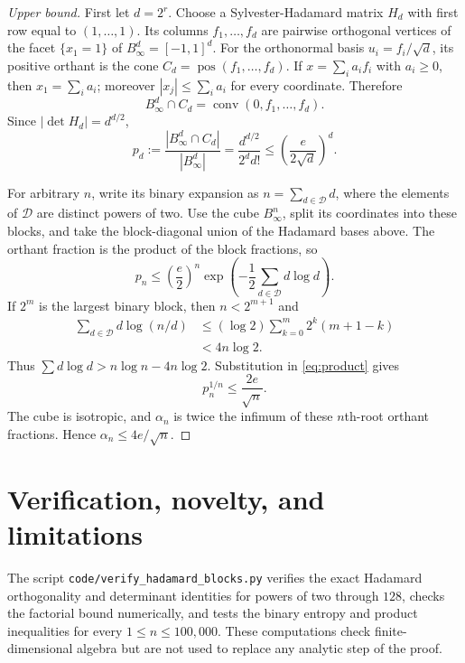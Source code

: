 \documentclass[11pt]{article}
\newcommand{\conv}{\operatorname{conv}}
\begin{document}
\begin{proof}[Upper bound]
First let $d=2^r$.  Choose a Sylvester-Hadamard matrix $H_d$ with first row
equal to $(1,\ldots,1)$.  Its columns $f_1,\ldots,f_d$ are pairwise
orthogonal vertices of the facet $\{x_1=1\}$ of $B_\infty^d=[-1,1]^d$.
For the orthonormal basis $u_i=f_i/\sqrt d$, its positive orthant is the cone
$C_d=\operatorname{pos}(f_1,\ldots,f_d)$.  If
$x=\sum_i a_if_i$ with $a_i\ge0$, then $x_1=\sum_i a_i$; moreover
$|x_j|\le\sum_i a_i$ for every coordinate.  Therefore
\[
 B_\infty^d\cap C_d=\conv(0,f_1,\ldots,f_d).
\]
Since $|\det H_d|=d^{d/2}$,
\begin{equation}
 p_d:=\frac{|B_\infty^d\cap C_d|}{|B_\infty^d|}
 =\frac{d^{d/2}}{2^d d!}
 \le\left(\frac{e}{2\sqrt d}\right)^d.
 \label{eq:block}
\end{equation}

For arbitrary $n$, write its binary expansion as
$n=\sum_{d\in\mathcal D}d$, where the elements of $\mathcal D$ are distinct
powers of two.  Use the cube $B_\infty^n$, split its coordinates into these
blocks, and take the block-diagonal union of the Hadamard bases above.  The
orthant fraction is the product of the block fractions, so
\begin{equation}
 p_n\le\left(\frac e2\right)^n
       \exp\left(-\frac12\sum_{d\in\mathcal D}d\log d\right).
 \label{eq:product}
\end{equation}
If $2^m$ is the largest binary block, then $n<2^{m+1}$ and
\begin{align*}
 \sum_{d\in\mathcal D}d\log(n/d)
 &\le(\log2)\sum_{k=0}^m2^k(m+1-k)\\
 &<4n\log2.
\end{align*}
Thus $\sum d\log d>n\log n-4n\log2$.  Substitution in
\eqref{eq:product} gives
\[
 p_n^{1/n}\le\frac{2e}{\sqrt n}.
\]
The cube is isotropic, and $\alpha_n$ is twice the infimum of these $n$th-root
orthant fractions.  Hence $\alpha_n\le4e/\sqrt n$.
\end{proof}

\section{Verification, novelty, and limitations}

The script \texttt{code/verify\_hadamard\_blocks.py} verifies the exact
Hadamard orthogonality and determinant identities for powers of two through
$128$, checks the factorial bound numerically, and tests the binary entropy
and product inequalities for every $1\le n\le100{,}000$.  These computations
check finite-dimensional algebra but are not used to replace any analytic
step of the proof.
\end{document}
